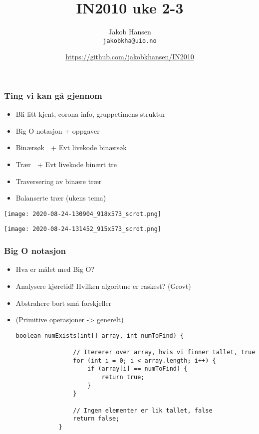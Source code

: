 \documentclass[norsk, handout]{beamer}
\title{IN2010 uke 2-3}
\author{Jakob Hansen \\ \texttt{jakobkha@uio.no}}
\date{\url{https://github.com/jakobkhansen/IN2010}}
\begin{document}
	\frame{\titlepage}
    \begin{frame}
        \frametitle{Ting vi kan gå gjennom}
        \center
        \begin{itemize}
            \item Bli litt kjent, corona info, gruppetimens struktur
            \item Big O notasjon + oppgaver
            \item Binærsøk {\Emoji 🔎} + Evt livekode binærsøk
            \item Trær {\Emoji 🌲} + Evt livekode binært tre
            \item Traversering av binære trær
            \item Balanserte trær (ukens tema)
        \end{itemize}
    \end{frame}

    \begin{frame}
        \begin{center}
            \texttt{[image: 2020-08-24-130904\_918x573\_scrot.png]}
        \end{center}
    \end{frame}

    \begin{frame}
        \begin{center}
            \texttt{[image: 2020-08-24-131452\_915x573\_scrot.png]}
        \end{center}
    \end{frame}

    \begin{frame}[fragile]
        \frametitle{Big O notasjon}
        \begin{itemize}
            \item Hva er målet med Big O?
            \pause
        \item Analysere kjøretid! Hvilken algoritme er raskest? (Grovt)
        \pause
    \item Abstrahere bort små forskjeller 
    \item (Primitive operasjoner -> generelt)
        \pause
        \begin{lstlisting}[basicstyle=\scriptsize]
            boolean numExists(int[] array, int numToFind) {

                // Itererer over array, hvis vi finner tallet, true
                for (int i = 0; i < array.length; i++) {
                    if (array[i] == numToFind) {
                        return true;
                    }
                }

                // Ingen elementer er lik tallet, false
                return false;
            }
		\end{lstlisting}
        \end{itemize}

    \end{frame}
\end{document}
